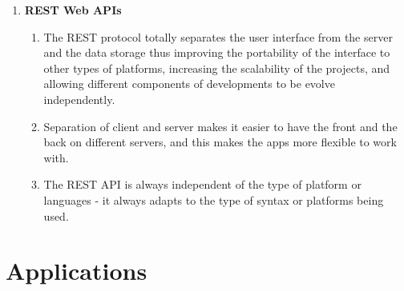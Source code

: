 \begin{enumerate}
\item \textbf{REST Web APIs}
	\begin{enumerate}
	\item[] The REST protocol totally separates the user interface from the server and the data storage thus improving the portability of the interface to other types of platforms, increasing the scalability of the projects, and allowing different components of developments to be evolve independently.
	\item[] Separation of client and server makes it easier to have the front and the back on different servers, and this makes the apps more flexible to work with.
	\item[] The REST API is always independent of the type of platform or languages - it always adapts to the type of syntax or platforms being used.
	\end{enumerate}

\end{enumerate}

\section{Applications}

\begin{comment}
\begin{enumerate}
\item \textbf{Machine Learning}
Being a broad field of study, it finds application in a wide variety of fields. One such new field is enhancing classical automation systems for smart homes and non-critical industrial operations by working on behavioral data in real-time. Although we are more focused on home automation, this system can be modified to suit even industrial systems.

\item \textbf{Raspberry Pi}
It is a complete computer system in itself and can be used in a variety of places. It's major applications include use as PC, smart device, hobby computer, teaching aid, IoT Hub etc.

\item \textbf{SciKit Learn}
Applications of this library are just as vast as that of machine learning itself. It has been used by various projects dealing with everything from artificial intelligence to big data analytics.
\end{enumerate}
\end{comment}


